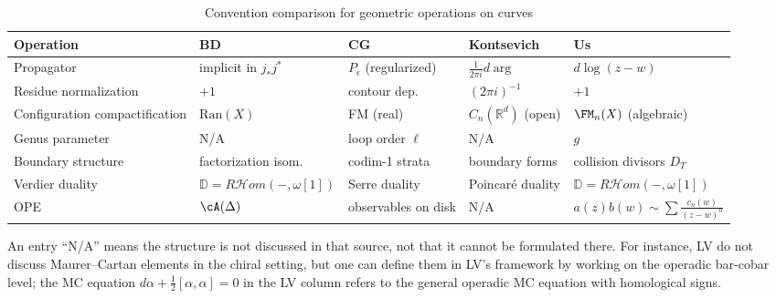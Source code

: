 \begin{table}[H]
\centering
\caption{Convention comparison for geometric operations on curves}
\label{tab:geometric-operations-comparison}
\renewcommand{\arraystretch}{1.5}
\footnotesize
\begin{tabular}{|>{\raggedright\arraybackslash}p{3.6cm}|>{\raggedright\arraybackslash}p{2.5cm}|>{\raggedright\arraybackslash}p{2.5cm}|>{\raggedright\arraybackslash}p{2.2cm}|>{\raggedright\arraybackslash}p{2.5cm}|}
\hline
\textbf{Operation} & \textbf{BD} & \textbf{CG} & \textbf{Kontsevich} & \textbf{Us} \\
\hline
\hline
Propagator & implicit in $j_*j^*$ & $P_\epsilon$ (regularized) & $\frac{1}{2\pi i}d\arg$ & $d\log(z-w)$ \\
\hline
Residue normalization & $+1$ & contour dep.\ & $(2\pi i)^{-1}$ & $+1$ \\
\hline
Configuration compactification & $\mathrm{Ran}(X)$ & FM (real) & $C_n(\mathbb{R}^d)$ (open) & $\FM_n(X)$ (algebraic) \\
\hline
Genus parameter & N/A & loop order $\ell$ & N/A & $g$ \\
\hline
Boundary structure & factorization isom.\ & codim-1 strata & boundary forms & collision divisors $D_T$ \\
\hline
Verdier duality & $\mathbb{D} = R\mathcal{H}om(-,\omega[1])$ & Serre duality & Poincar\'e duality & $\mathbb{D} = R\mathcal{H}om(-,\omega[1])$ \\
\hline
OPE & $\cA(\Delta)$ & observables on disk & N/A & $a(z)b(w) \sim \sum \frac{c_n(w)}{(z-w)^n}$ \\
\hline
\end{tabular}
\end{table}

\begin{remark}
An entry ``N/A'' means the structure is not discussed in that source,
not that it cannot be formulated there. For instance, LV do not discuss
Maurer--Cartan elements in the chiral setting, but one can define them in
LV's framework by working on the operadic bar-cobar level; the MC equation
$d\alpha + \frac{1}{2}[\alpha,\alpha] = 0$ in the LV column refers to
the general operadic MC equation with homological signs.
\end{remark}



